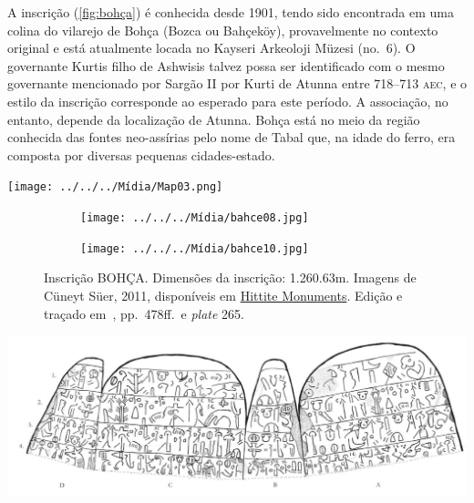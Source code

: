 A inscrição (\autoref{fig:bohça}) é conhecida desde 1901, tendo sido encontrada
em uma colina do vilarejo de Bohça (Bozca ou Bahçeköy),
provavelmente no contexto original e está atualmente locada no Kayseri
Arkeoloji Müzesi (no.\ 6).
O governante Kurtis filho de Ashwisis talvez possa ser identificado com o
mesmo governante mencionado por Sargão II por Kurti de Atunna entre 718--713
\textsc{aec}, e o estilo da inscrição corresponde ao esperado para este
período.
A associação, no entanto, depende da localização de Atunna.
Bohça está no meio da região conhecida das fontes
neo-assírias pelo nome de Tabal que, na idade do ferro, era composta por
diversas pequenas cidades-estado.

\begin{center}
	\texttt{[image: ../../../Mídia/Map03.png]}
\end{center}


\begin{figure}[h]
	\centering
	\begin{subfigure}{0.49\textwidth}
		\texttt{[image: ../../../Mídia/bahce08.jpg]}
	\end{subfigure}
	\hfill
	\begin{subfigure}{0.49\textwidth}
		\texttt{[image: ../../../Mídia/bahce10.jpg]}
	\end{subfigure}
	\caption[BOHÇA]{Inscrição BOHÇA. Dimensões da inscrição:
		1.26\times0.63m.
		Imagens de Cüneyt Süer, 2011,
		disponíveis em
		\href{https://www.hittitemonuments.com/bahcekoy/}{Hittite Monuments}.
		Edição e traçado em~, pp.\ 478ff.\ e \emph{plate}
		265.
	}\label{fig:bohça}
\end{figure}

\clearpage

\begin{center}
	\includegraphics[width=\textheight,angle=90]{../../../Mídia/bohça.png}
\end{center}



